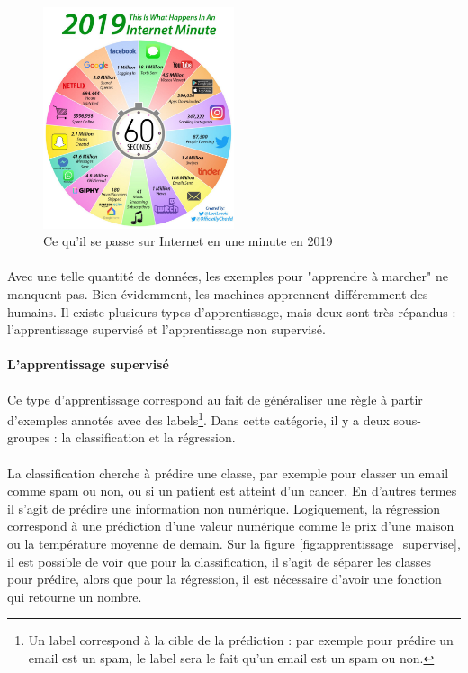 \documentclass[10pt, french, a4paper]{article}
\begin{document}
\begin{figure}[hbt!]
    \centering
    \includegraphics[width=0.5\textwidth]{images/internet-minute-2019.jpg}
    \caption{Ce qu'il se passe sur Internet en une minute en 2019 \citep{desjardins_what_2019}}
    \label{fig:internet_minute_2019}
\end{figure}

\paragraph{}
Avec une telle quantité de données, les exemples pour "apprendre à marcher" ne manquent pas. Bien évidemment, les machines apprennent différemment des humains. Il existe plusieurs types d'apprentissage, mais deux sont très répandus : l'apprentissage supervisé et l'apprentissage non supervisé.

\paragraph{L'apprentissage supervisé}
Ce type d'apprentissage correspond au fait de généraliser une règle à partir d'exemples annotés avec des labels\footnote{Un label correspond à la cible de la prédiction : par exemple pour prédire un email est un spam, le label sera le fait qu'un email est un spam ou non.}. Dans cette catégorie, il y a deux sous-groupes : la classification et la régression.

\paragraph{}
La classification cherche à prédire une classe, par exemple pour classer un email comme spam ou non, ou si un patient est atteint d'un cancer. En d'autres termes il s'agit de prédire une information non numérique. Logiquement, la régression correspond à une prédiction d'une valeur numérique comme le prix d'une maison ou la température moyenne de demain. Sur la figure \ref{fig:apprentissage_supervise}, il est possible de voir que pour la classification, il s'agit de séparer les classes pour prédire, alors que pour la régression, il est nécessaire d'avoir une fonction qui retourne un nombre.
\end{document}
